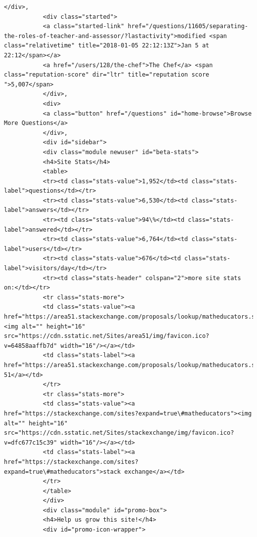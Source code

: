 \documentclass[11pt]{article}
\begin{document}
\begin{Verbatim}[commandchars=\\\{\}]
           </div>,
           <div class="started">
           <a class="started-link" href="/questions/11605/separating-the-roles-of-teacher-and-assessor/?lastactivity">modified <span class="relativetime" title="2018-01-05 22:12:13Z">Jan 5 at 22:12</span></a>
           <a href="/users/128/the-chef">The Chef</a> <span class="reputation-score" dir="ltr" title="reputation score ">5,007</span>
           </div>,
           <div>
           <a class="button" href="/questions" id="home-browse">Browse More Questions</a>
           </div>,
           <div id="sidebar">
           <div class="module newuser" id="beta-stats">
           <h4>Site Stats</h4>
           <table>
           <tr><td class="stats-value">1,952</td><td class="stats-label">questions</td></tr>
           <tr><td class="stats-value">6,530</td><td class="stats-label">answers</td></tr>
           <tr><td class="stats-value">94\%</td><td class="stats-label">answered</td></tr>
           <tr><td class="stats-value">6,764</td><td class="stats-label">users</td></tr>
           <tr><td class="stats-value">676</td><td class="stats-label">visitors/day</td></tr>
           <tr><td class="stats-header" colspan="2">more site stats on:</td></tr>
           <tr class="stats-more">
           <td class="stats-value"><a href="https://area51.stackexchange.com/proposals/lookup/matheducators.stackexchange.com"><img alt="" height="16" src="https://cdn.sstatic.net/Sites/area51/img/favicon.ico?v=64858aaffb7d" width="16"/></a></td>
           <td class="stats-label"><a href="https://area51.stackexchange.com/proposals/lookup/matheducators.stackexchange.com">area 51</a></td>
           </tr>
           <tr class="stats-more">
           <td class="stats-value"><a href="https://stackexchange.com/sites?expand=true\#matheducators"><img alt="" height="16" src="https://cdn.sstatic.net/Sites/stackexchange/img/favicon.ico?v=dfc677c15c39" width="16"/></a></td>
           <td class="stats-label"><a href="https://stackexchange.com/sites?expand=true\#matheducators">stack exchange</a></td>
           </tr>
           </table>
           </div>
           <div class="module" id="promo-box">
           <h4>Help us grow this site!</h4>
           <div id="promo-icon-wrapper">

\end{Verbatim}
\end{document}
